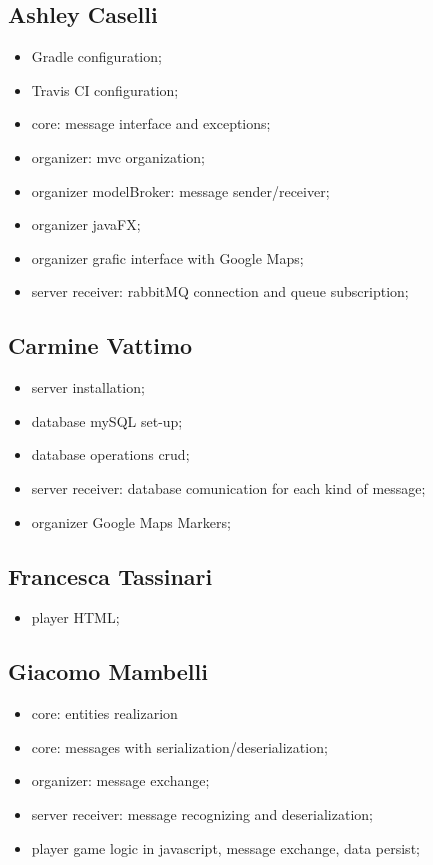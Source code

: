 \documentclass[12pt, english]{report}
\begin{document}
\subsection{Ashley Caselli}
\begin{itemize}
	\item Gradle configuration;
	\item Travis CI configuration;
	\item core: message interface and exceptions;
	\item organizer: mvc organization;
	\item organizer modelBroker: message sender/receiver;
	\item organizer javaFX;
	\item organizer grafic interface with Google Maps;
	\item server receiver: rabbitMQ connection and queue subscription;
	
\end{itemize}
\subsection{Carmine Vattimo}
\begin{itemize}
	\item server installation;
	\item database mySQL set-up;
	\item database operations crud;
	\item server receiver: database comunication for each kind of message;
	\item organizer Google Maps Markers;
\end{itemize}
\subsection{Francesca Tassinari}
\begin{itemize}
	\item player HTML;
\end{itemize}
\subsection{Giacomo Mambelli}
\begin{itemize}
	\item core: entities realizarion
	\item core: messages with serialization/deserialization;
	\item organizer: message exchange;
	\item server receiver: message recognizing and deserialization;
	\item player game logic in javascript, message exchange, data persist;
\end{itemize}
\end{document}
